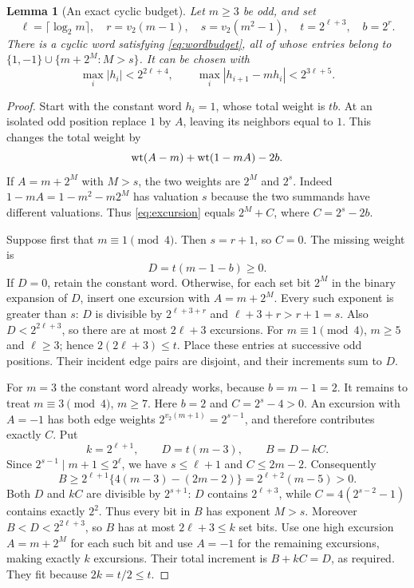 \documentclass[11pt,a4paper]{article}
\newtheorem{lemma}[theorem]{Lemma}
\theoremstyle{definition}\newtheorem{definition}[theorem]{Definition}
\theoremstyle{remark}\newtheorem{remark}[theorem]{Remark}
\begin{document}
\begin{lemma}[An exact cyclic budget]\label{lem:word}
Let $m\ge3$ be odd, and set
\begin{equation}\label{eq:parameters}
 \ell=\lceil\log_2m\rceil,\quad r=v_2(m-1),\quad
 s=v_2(m^2-1),\quad t=2^{\ell+3},\quad b=2^r.
\end{equation}
There is a cyclic word satisfying \eqref{eq:wordbudget}, all of whose
entries belong to $\{1,-1\}\cup\{m+2^M:M>s\}$. It can be chosen with
\begin{equation}\label{eq:wordbounds}
 \max_i|h_i|<2^{2\ell+4},\qquad
 \max_i|h_{i+1}-mh_i|<2^{3\ell+5}.
\end{equation}
\end{lemma}
\begin{proof}
Start with the constant word $h_i=1$, whose total weight is $tb$.
At an isolated odd position replace $1$ by $A$, leaving its neighbors
equal to $1$. This changes the total weight by
\begin{equation}\label{eq:excursion}
 \operatorname{wt}(A-m)+\operatorname{wt}(1-mA)-2b.
\end{equation}
If $A=m+2^M$ with $M>s$, the two weights are $2^M$ and $2^s$.
Indeed $1-mA=1-m^2-m2^M$ has valuation $s$ because the two summands
have different valuations. Thus \eqref{eq:excursion} equals
$2^M+C$, where $C=2^s-2b$.

Suppose first that $m\equiv1\pmod4$. Then $s=r+1$, so $C=0$.
The missing weight is
\[
 D=t(m-1-b)\ge0.
\]
If $D=0$, retain the constant word. Otherwise, for each set bit $2^M$
in the binary expansion of $D$, insert one excursion with $A=m+2^M$.
Every such exponent is greater than $s$: $D$ is divisible by
$2^{\ell+3+r}$ and $\ell+3+r>r+1=s$. Also
$D<2^{2\ell+3}$, so there are at most $2\ell+3$ excursions. For
$m\equiv1\pmod4$, $m\ge5$ and $\ell\ge3$; hence
$2(2\ell+3)\le t$. Place these entries at successive odd positions.
Their incident edge pairs are disjoint, and their increments sum to $D$.

For $m=3$ the constant word already works, because $b=m-1=2$.
It remains to treat $m\equiv3\pmod4$, $m\ge7$. Here $b=2$ and
$C=2^s-4>0$. An excursion with $A=-1$ has both edge weights
$2^{v_2(m+1)}=2^{s-1}$, and therefore contributes exactly $C$.
Put
\[
 k=2^{\ell+1},\qquad D=t(m-3),\qquad B=D-kC.
\]
Since $2^{s-1}\mid m+1\le2^\ell$, we have $s\le\ell+1$ and
$C\le2m-2$. Consequently
\[
 B\ge2^{\ell+1}\{4(m-3)-(2m-2)\}
   =2^{\ell+2}(m-5)>0.
\]
Both $D$ and $kC$ are divisible by $2^{s+1}$: $D$ contains
$2^{\ell+3}$, while $C=4(2^{s-2}-1)$ contains exactly $2^2$.
Thus every bit in $B$ has exponent $M>s$. Moreover
$B<D<2^{2\ell+3}$, so $B$ has at most $2\ell+3\le k$ set bits.
Use one high excursion $A=m+2^M$ for each such bit and use $A=-1$
for the remaining excursions, making exactly $k$ excursions.
Their total increment is $B+kC=D$, as required. They fit because
$2k=t/2\le t$.


\end{proof}
\end{document}
